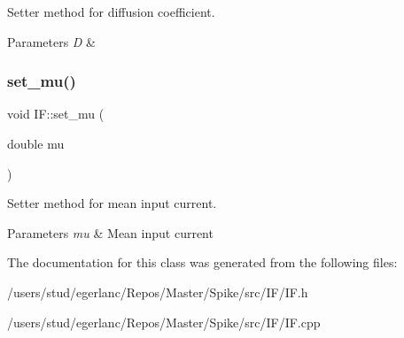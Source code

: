 Setter method for diffusion coefficient. 


\begin{DoxyParams}{Parameters}
{\em D} & \\
\hline
\end{DoxyParams}
\mbox{\label{classIF_a4ca244c0e1095a3014af3cdbf225ded1}} 
\subsubsection{\texorpdfstring{set\+\_\+mu()}{set\_mu()}}
{\footnotesize\ttfamily void I\+F\+::set\+\_\+mu (\begin{DoxyParamCaption}\item[{double}]{mu }\end{DoxyParamCaption})\hspace{0.3cm}{\ttfamily [inline]}}



Setter method for mean input current. 


\begin{DoxyParams}{Parameters}
{\em mu} & Mean input current \\
\hline
\end{DoxyParams}


The documentation for this class was generated from the following files\+:\begin{DoxyCompactItemize}
\item 
/users/stud/egerlanc/\+Repos/\+Master/\+Spike/src/\+I\+F/I\+F.\+h\item 
/users/stud/egerlanc/\+Repos/\+Master/\+Spike/src/\+I\+F/I\+F.\+cpp\end{DoxyCompactItemize}
